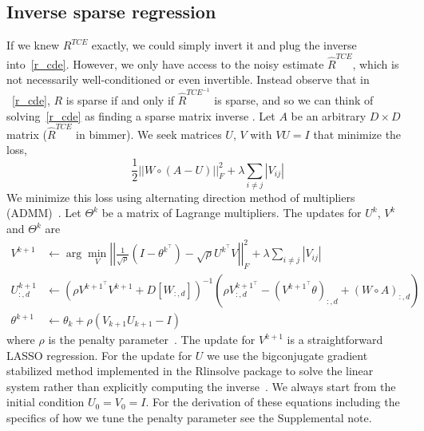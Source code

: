 \documentclass{article}
\begin{document}
\subsection{Inverse sparse regression}
If we knew $R^{TCE}$ exactly, we could simply invert it and plug the inverse
into~\eqref{r_cde}. However, we only have access to the noisy estimate $\hat{R}^{TCE}$, which is not necessarily
well-conditioned or even invertible. Instead observe that in ~\eqref{r_cde}, $R$ is
sparse if and only if $\hat{R}^{TCE^{-1}}$ is sparse, and so we can think of
solving~\eqref{r_cde} as finding a sparse matrix inverse . Let $A$ be an arbitrary $D\times D$
matrix ($\hat{R}^{TCE}$ in bimmer). We seek matrices $U$, $V$ with $VU=I$ that minimize the loss,
\begin{equation}
\frac{1}{2} ||W \circ (A - U)||_F^2 + \lambda \sum_{i\neq j}|V_{ij}|
\end{equation}
We minimize this loss using alternating direction method of multipliers (ADMM)~\cite{Boyd2010}.
Let $\Theta^k$ be a matrix of Lagrange multipliers. The updates for $U^k$, $V^k$ and $\Theta^k$
are
\begin{align}
V^{k+1} &\leftarrow \arg \min_{V} \left|\left|\frac{1}{\sqrt{\rho}}\left(I-\theta^{k^\top}\right) -
      \sqrt{\rho} U^{k^\top} V\right|\right|_F^2 + \lambda \sum_{i\neq j} \left|V_{ij} \right| \\
U_{:, d}^{k+1} &\leftarrow \left(\rho V^{k+1 ^ \top} V^{k+1} + D[W_{:, d}]\right)^{-1} \left(\rho V^{k+1 ^ \top}_{:, d} -
  \left(V^{k+1 ^ \top} \theta\right)_{:, d} + (W \circ A)_{:, d}\right) \\
\theta^{k+1} &\leftarrow \theta_{k} + \rho(V_{k+1}U_{k+1}-I)
\end{align}
where $\rho$ is the penalty parameter~\cite{Boyd2010}.
The update for $V^{k+1}$ is a straightforward LASSO regression. For the update for $U$ 
we use the bigconjugate  gradient stabilized method implemented
in the Rlinsolve package to solve the linear system
rather than explicitly computing the inverse~\cite{You2018}.
We always start from the initial condition $U_0 = V_0 = I$.
 For the derivation of these equations including
the specifics of how we tune
the penalty parameter see the Supplemental note.
\end{document}
